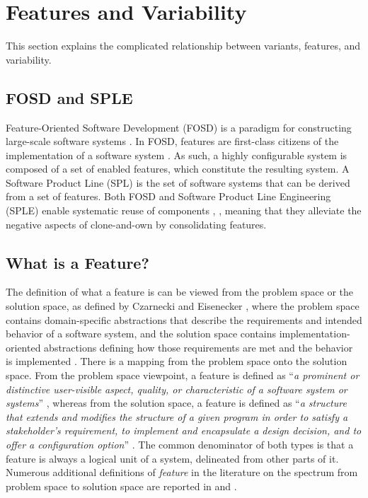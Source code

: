 \section{Features and Variability}
This section explains the complicated relationship between variants, features, and variability. 

\subsection{FOSD and SPLE}
Feature-Oriented Software Development (FOSD) is a paradigm for constructing large-scale software systems \cite{apel2009overview}. In FOSD, features are first-class citizens of the implementation of a software system \cite{apel2009overview}. As such, a highly configurable system is composed of a set of enabled features, which constitute the resulting system. A Software Product Line (SPL) is the set of software systems that can be derived from a set of features. Both FOSD and Software Product Line Engineering (SPLE) enable systematic reuse of components \cite{apel2009overview}, \cite{antkiewicz2014flexible}, meaning that they alleviate the negative aspects of clone-and-own by consolidating features.

\subsection{What is a Feature?}
The definition of what a feature is can be viewed from the problem space or the solution space, as defined by Czarnecki and Eisenecker \cite{czarnecki2000generative}, where the problem space contains domain-specific abstractions that describe the requirements  and intended behavior of a software system, and the solution space contains implementation-oriented abstractions defining how those requirements are met and the behavior is implemented \cite{apel2009overview}. There is a mapping from the problem space onto the solution space. From the problem space viewpoint, a feature is defined as ``\textit{a prominent or distinctive user-visible aspect, quality, or characteristic of a software system or systems}'' \cite{kang1990feature}, whereas from the solution space, a feature is defined as ``\textit{a structure that extends and modifies the structure of a given program in order to satisfy a stakeholder's requirement, to implement and encapsulate a design decision, and to offer a configuration option}'' \cite{apel2008algebra}.
The common denominator of both types is that a feature is always a logical unit of a system, delineated from other parts of it. Numerous additional definitions of \textit{feature} in the literature on the spectrum from problem space to solution space are reported in \cite{apel2009overview} and \cite{berger2015feature}.

